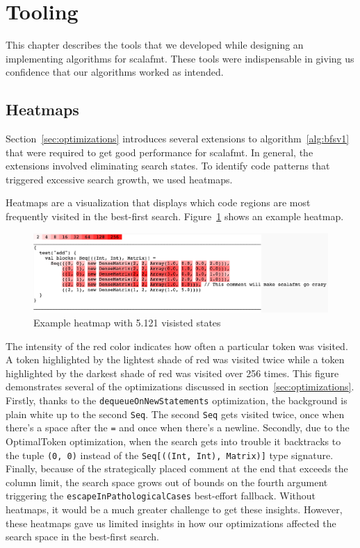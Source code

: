 \section{Tooling}\label{sec:tooling}
This chapter describes the tools that we developed while designing an implementing algorithms for scalafmt.
These tools were indispensable in giving us confidence that our algorithms worked as intended.

\subsection{Heatmaps}
Section~\ref{sec:optimizations} introduces several extensions to algorithm~\ref{alg:bfsv1} that were required to get good performance for scalafmt.
In general, the extensions involved eliminating search states.
To identify code patterns that triggered excessive search growth, we used heatmaps.

Heatmaps are a visualization that displays which code regions are most frequently visited in the best-first search.
Figure~\ref{fig:heatmap} shows an example heatmap.
\begin{figure}
  \centering
  \includegraphics[width=\textwidth]{img/heatmap.png}
  \caption{Example heatmap with 5.121 visisted states}
  \label{fig:heatmap}
\end{figure}
The intensity of the red color indicates how often a particular token was visited.
A token highlighted by the lightest shade of red was visited twice while a token highlighted by the darkest shade of red was visited over 256 times.
This figure demonstrates several of the optimizations discussed in section~\ref{sec:optimizations}.
Firstly, thanks to the \texttt{dequeueOnNewStatements} optimization, the background is plain white up to the second \texttt{Seq}.
The second \texttt{Seq} gets visited twice, once when there's a space after the \texttt{=} and once when there's a newline.
Secondly, due to the OptimalToken optimization, when the search gets into trouble it backtracks to the tuple \texttt{(0, 0)} instead of the \texttt{Seq[((Int, Int), Matrix)]} type signature.
Finally, because of the strategically placed comment at the end that exceeds the column limit, the search space grows out of bounds on the fourth argument triggering the \texttt{escapeInPathologicalCases} best-effort fallback.
Without heatmaps, it would be a much greater challenge to get these insights.
However, these heatmaps gave us limited insights in how our optimizations affected the search space in the best-first search.

